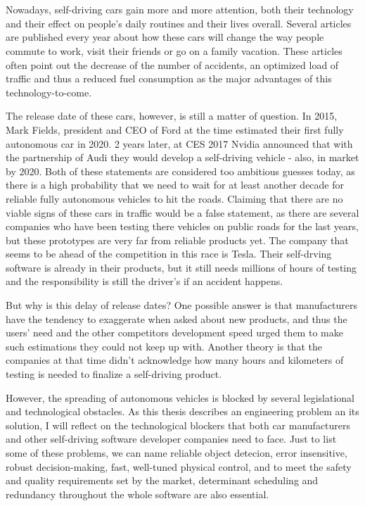 \chapter{\bevezetes}

Nowadays, self-driving cars gain more and more attention, both their technology and their effect on people's daily routines and their lives overall. Several articles are published every year about how these cars will change the way people commute to work, visit their friends or go on a family vacation. These articles often point out the decrease of the number of accidents, an optimized load of traffic and thus a reduced fuel consumption as the major advantages of this technology-to-come.

The release date of these cars, however, is still a matter of question. In 2015, Mark Fields, president and CEO of Ford at the time estimated their first fully autonomous car in 2020. 2 years later, at CES 2017 Nvidia announced that with the partnership of Audi they would develop a self-driving vehicle - also, in market by 2020. Both of these statements are considered too ambitious guesses today, as there is a high probability that we need to wait for at least another decade for reliable fully autonomous vehicles to hit the roads. Claiming that there are no viable signs of these cars in traffic would be a false statement, as there are several companies who have been testing there vehicles on public roads for the last years, but these prototypes are very far from reliable products yet. The company that seems to be ahead of the competition in this race is Tesla. Their self-drving software is already in their products, but it still needs millions of hours of testing and the responsibility is still the driver's if an accident happens.

But why is this delay of release dates? One possible answer is that manufacturers have the tendency to exaggerate when asked about new products, and thus the users' need and the other competitors development speed urged them to make such estimations they could not keep up with. Another theory is that the companies at that time didn't acknowledge how many hours and kilometers of testing is needed to finalize a self-driving product.

However, the spreading of autonomous vehicles is blocked by several legislational and technological obstacles. As this thesis describes an engineering problem an its solution, I will reflect on the technological blockers that both car manufacturers and other self-driving software developer companies need to face. Just to list some of these problems, we can name reliable object detecion, error insensitive, robust decision-making, fast, well-tuned physical control, and to meet the safety and quality requirements set by the market, determinant scheduling and redundancy throughout the whole software are also essential.

